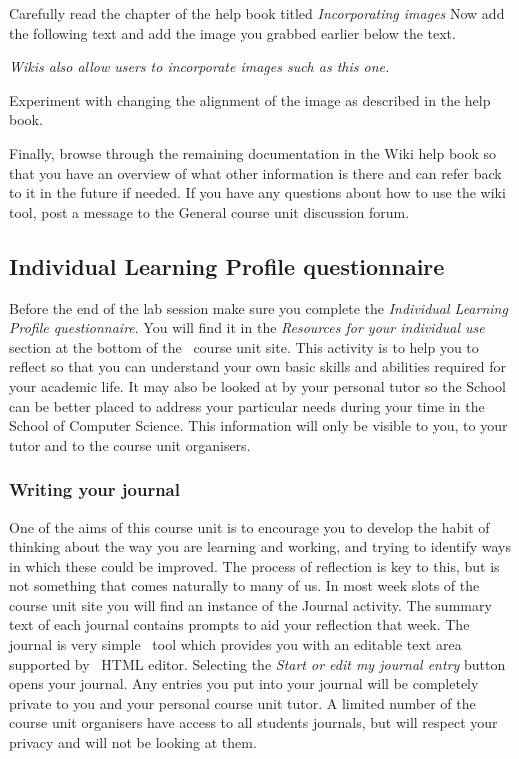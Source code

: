 Carefully read the chapter of the help book titled \emph{Incorporating images}  Now add the following text and add the image you grabbed earlier below the text.

\emph{Wikis also allow users to incorporate images such as this one.} 

Experiment with changing the alignment of the image as described in the help book.

Finally, browse through the remaining documentation in the Wiki help book so that you have an overview of what other information is there and can refer back to it in the future if needed. If you have any questions about how to use the wiki tool, post a message to the General course unit discussion forum.

\subsection{Individual Learning Profile questionnaire}
\label{sec:indiv-learn-prof}

Before the end of the lab session make sure you complete the \emph{Individual Learning Profile questionnaire}. You will find it in the \emph{Resources for your individual use} section at the bottom of the \moodle\ course unit site. This activity is to help you to reflect so that you can understand your own basic skills and abilities required for your academic life. It may also be looked at by your personal tutor so the School can be better placed to address your particular needs during your time in the School of Computer Science. This information will only be visible to you, to your tutor and to the course unit organisers.

\subsubsection*{Writing your journal}
\label{sec:writing-your-journal}


One of the aims of this course unit is to encourage you to develop the habit of thinking about the way you are learning and working, and trying to identify ways in which these could be improved. The process of reflection is key to this, but is not something that comes naturally to many of us. In most week slots of the course unit site you will find an instance of the Journal activity. The summary text of each journal contains prompts to aid your reflection that week. The journal is very simple \moodle\ tool which provides you with an editable text area supported by \moodle\ HTML editor. Selecting the \emph{Start or edit my journal entry} button opens your journal. Any entries you put into your journal will be completely private to you and your personal course unit tutor. A limited number of the course unit organisers have access to all students journals, but will respect your privacy and will not be looking at them.

